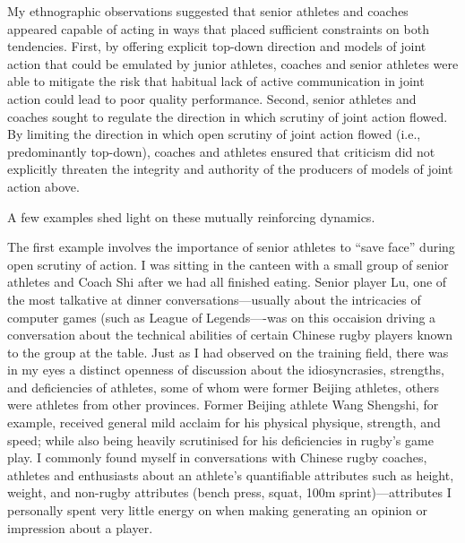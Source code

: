 \begin{CJK}{UTF8}{gbsn}
My ethnographic observations suggested that senior athletes and coaches appeared capable of acting in ways that placed sufficient constraints on both tendencies.  First, by offering explicit top-down direction and models of joint action that could be emulated by junior athletes, coaches and senior athletes were able to mitigate the risk that habitual lack of active communication in joint action could lead to poor quality performance.  Second, senior athletes and coaches sought to regulate the direction in which scrutiny of joint action flowed.  By limiting the direction in which open scrutiny of joint action flowed (i.e., predominantly top-down), coaches and athletes ensured that criticism did not explicitly threaten the integrity and authority of the producers of models of joint action above.

A few examples shed light on these mutually reinforcing dynamics.

The first example involves the importance of senior athletes to ``save face'' during open scrutiny of action.  I was sitting in the canteen with a small group of senior athletes and Coach Shi after we had all finished eating.  Senior player Lu, one of the most talkative at dinner conversations---usually about the intricacies of computer games (such as League of Legends----was on this occaision driving a conversation about the technical abilities of certain Chinese rugby players known to the group at the table.  Just as I had observed on the training field, there was in my eyes a distinct openness of discussion about the idiosyncrasies, strengths, and deficiencies of athletes, some of whom were former Beijing athletes, others were athletes from other provinces.  Former Beijing athlete Wang Shengshi, for example, received general mild acclaim for his physical physique, strength, and speed; while also being heavily scrutinised for his deficiencies in rugby's game play. I commonly found myself in conversations with Chinese rugby coaches, athletes and enthusiasts about an athlete's quantifiable attributes such as height, weight, and non-rugby attributes (bench press, squat, 100m sprint)---attributes I personally spent very little energy on when making generating an opinion or impression about a player.


\end{CJK}

